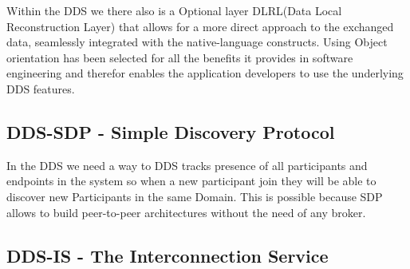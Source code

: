 Within the DDS we there also is a Optional layer DLRL(Data Local Reconstruction Layer) that allows for a more direct approach to the exchanged data, seamlessly integrated with the native-language
constructs. Using Object orientation has been selected for all the benefits it provides in software engineering and therefor enables the application developers to use the underlying DDS features.

\subsection{DDS-SDP - Simple Discovery Protocol}
In the DDS we need a way to DDS tracks presence of all participants and endpoints in the system so when a new participant join they will be able to discover new Participants in the same Domain. This is possible because SDP allows to build peer-to-peer architectures without the need of any broker. 

\subsection{DDS-IS - The Interconnection Service}
